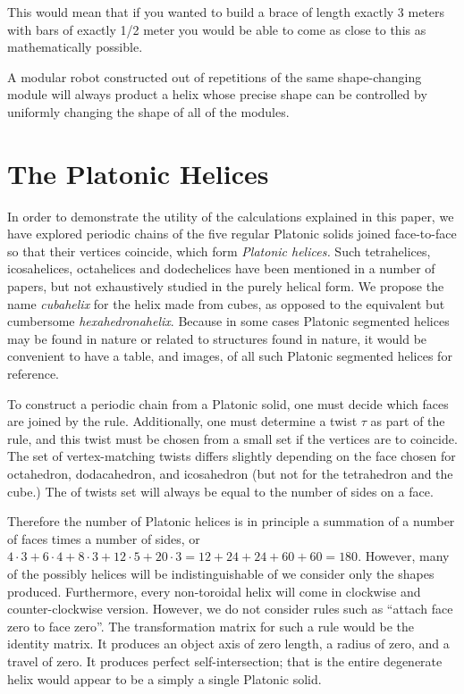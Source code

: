 \documentclass[11pt]{article}
\begin{document}
{This would mean that if you wanted to build a brace of length exactly 3 meters
with bars of exactly 1/2 meter you would be able to come as close to this
as mathematically possible.

A modular robot constructed out of repetitions of the same shape-changing module will always product a helix
whose precise shape can be controlled by uniformly changing the shape of all of the modules.

\section{The Platonic Helices}

\label{sec:platonic}

In order to demonstrate the utility of the calculations explained in this paper, we have explored
periodic chains of the five regular Platonic solids joined face-to-face so that their vertices coincide,
which form {\em Platonic helices.}
Such tetrahelices, icosahelices, octahelices and dodechelices
have been mentioned in a number of papers\cite{elgersma2016quadrahelix,babiker2012combinatorial,lord2001sphere}, but not exhaustively studied in
the purely helical form.
We propose the name {\em cubahelix} for the helix made from cubes, as opposed to the equivalent
but cumbersome {\em hexahedronahelix}.
Because in some cases Platonic segmented helices may be found in nature or
related to structures found in nature\cite{lord2004gamma,pearce1990structure},
it would be convenient to have a table, and images, of all such Platonic segmented helices for reference.

To construct a periodic chain from a Platonic solid, one must decide which faces are joined by the rule.
Additionally, one must determine a twist
$\tau$ as part of the rule, and this twist must be chosen from a small set if the vertices are to coincide.
The set of vertex-matching twists differs slightly depending on the face chosen for octahedron, dodacahedron, and icosahedron
(but not for the tetrahedron and the cube.) The of twists set will always be equal to the number of sides on a face.

Therefore the number of Platonic helices is in principle a summation of a number of faces times a number of sides, or
$4 \cdot 3 + 6 \cdot 4 + 8 \cdot 3 + 12 \cdot 5 + 20 \cdot 3 = 12 + 24 + 24 + 60 + 60 = 180$.
However, many of the possibly helices will be indistinguishable of we consider only the shapes produced. Furthermore,
every non-toroidal helix will come in clockwise and counter-clockwise version.
However, we do not consider rules such as ``attach face zero to face zero''.
The transformation matrix for such a rule would be the identity matrix.
It produces an object axis of zero length, a radius of zero, and
a travel of zero. It produces perfect self-intersection; that is the entire
degenerate helix would appear to be a simply a single Platonic solid.

}
\end{document}
